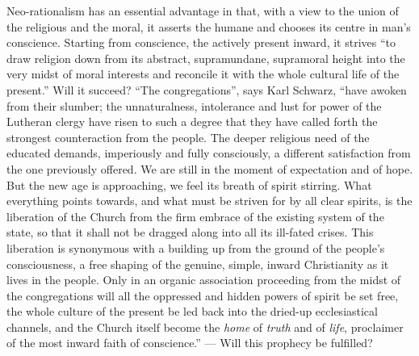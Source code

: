 \documentclass[12pt,a4paper,openany]{book}
\newcommand{\opage}[1]{\marginnote{\footnotesize\textit{[#1]}}}
\begin{document}
Neo-rationalism has an essential advantage in that,
with a view to the union of the religious and the
moral, it asserts the humane and chooses its centre
in man's conscience. Starting from conscience, the
actively present inward, it strives ``to draw
religion down from its abstract, supramundane, supramoral
height into the very midst of moral interests and reconcile
it with the whole cultural life of the present.'' Will it succeed?
``The congregations'', says Karl Schwarz, ``have awoken from
their slumber; the unnaturalness, intolerance
and lust for power of the Lutheran clergy have risen to such a degree that they
have called forth the strongest counteraction from the people.
The deeper religious need of the educated demands,
imperiously and fully consciously, a different satisfaction from
the one previously offered. We are still in the moment of expectation
and of hope. But the new age
is approaching, we feel its breath of spirit stirring. What
everything points towards, and what must be striven for by all
clear spirits, is the liberation of the Church from the firm embrace
of the existing system of the state, so that it shall not
be dragged along into all its ill-fated crises.
This liberation is synonymous with a building up from
the ground of the people's consciousness, a free shaping of the
genuine, simple, inward Christianity as it lives in
the people. Only in an organic association proceeding from
the midst of the congregations will all the oppressed and
hidden powers of spirit be set free, the whole culture of the present
be led back into the dried-up ecclesiastical channels, and
the Church itself become the
\setcounter{footnote}{0}%
\opage{109}\emph{home} of \emph{truth} and of \emph{life}, proclaimer of the most inward faith of conscience.''
--- Will this prophecy be fulfilled?
\end{document}
